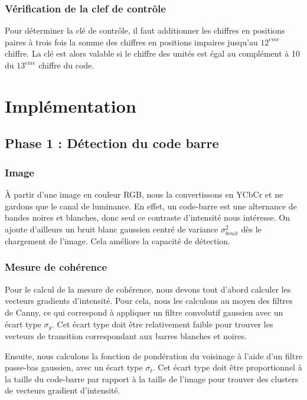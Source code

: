 \documentclass{rapport}
\begin{document}
\subsubsection*{Vérification de la clef de contrôle}
Pour déterminer la clé de contrôle, il faut additionner les chiffres en positions paires à trois fois la somme des
chiffres en positions impaires jusqu'au $12^{eme}$ chiffre. 
La clé est alors valable si le chiffre des unités est égal au complément à 10 du $13^{eme}$ chiffre du code.

\section{Implémentation}

\subsection{Phase 1 : Détection du code barre}
\subsubsection*{Image}
À partir d'une image en couleur RGB, nous la convertissons en YCbCr et ne gardons que le canal de luminance. En effet, un code-barre est une alternance de bandes noires et blanches, donc seul ce contraste d'intensité nous intéresse.
\newline On ajoute d'ailleurs un bruit blanc gaussien centré de variance $\sigma_{bruit}^2$ dès le chargement de l'image. Cela améliore la capacité de détection.

\subsubsection*{Mesure de cohérence}
\label{sec:coherence}
Pour le calcul de la mesure de cohérence, nous devons tout d'abord calculer les vecteurs gradients d'intensité. Pour cela, nous les calculons au moyen des filtres de Canny, ce qui correspond à appliquer un filtre convolutif gaussien avec un écart type $\sigma_g$. Cet écart type doit être relativement faible pour trouver les vecteurs de transition correspondant aux barres blanches et noires.

Ensuite, nous calculons la fonction de pondération du voisinage à l'aide d'un filtre passe-bas gaussien, avec un écart type $\sigma_t$. Cet écart type doit être proportionnel à la taille du code-barre par rapport à la taille de l'image pour trouver des clusters de vecteurs gradient d'intensité.
\end{document}
